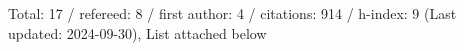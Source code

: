 Total: 17 / refereed: 8 / first author: 4 / citations: 914 / h-index: 9 (Last updated: 2024-09-30), List attached below